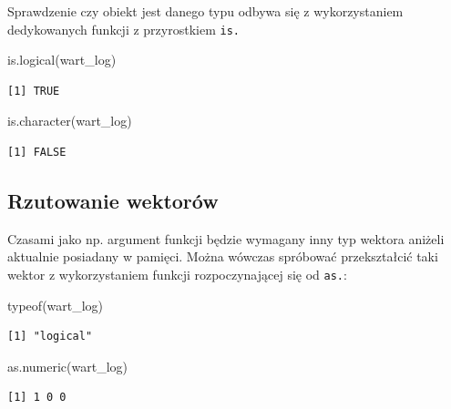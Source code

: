 \documentclass[
  letterpaper,
  DIV=11,
  numbers=noendperiod]{scrreprt}
\newenvironment{Shaded}{\begin{snugshade}}{\end{snugshade}}
\newcommand{\FunctionTok}[1]{\textcolor[rgb]{0.28,0.35,0.67}{#1}}
\newcommand{\NormalTok}[1]{\textcolor[rgb]{0.00,0.23,0.31}{#1}}
\begin{document}
Sprawdzenie czy obiekt jest danego typu odbywa się z wykorzystaniem
dedykowanych funkcji z przyrostkiem \texttt{is.}

\begin{Shaded}
\begin{Highlighting}[]
\FunctionTok{is.logical}\NormalTok{(wart\_log)}
\end{Highlighting}
\end{Shaded}

\begin{verbatim}
[1] TRUE
\end{verbatim}

\begin{Shaded}
\begin{Highlighting}[]
\FunctionTok{is.character}\NormalTok{(wart\_log)}
\end{Highlighting}
\end{Shaded}

\begin{verbatim}
[1] FALSE
\end{verbatim}

\hypertarget{rzutowanie-wektoruxf3w}{%
\subsection{Rzutowanie wektorów}\label{rzutowanie-wektoruxf3w}}

Czasami jako np. argument funkcji będzie wymagany inny typ wektora
aniżeli aktualnie posiadany w pamięci. Można wówczas spróbować
przekształcić taki wektor z wykorzystaniem funkcji rozpoczynającej się
od \texttt{as.}:

\begin{Shaded}
\begin{Highlighting}[]
\FunctionTok{typeof}\NormalTok{(wart\_log)}
\end{Highlighting}
\end{Shaded}

\begin{verbatim}
[1] "logical"
\end{verbatim}

\begin{Shaded}
\begin{Highlighting}[]
\FunctionTok{as.numeric}\NormalTok{(wart\_log)}
\end{Highlighting}
\end{Shaded}

\begin{verbatim}
[1] 1 0 0
\end{verbatim}
\end{document}
